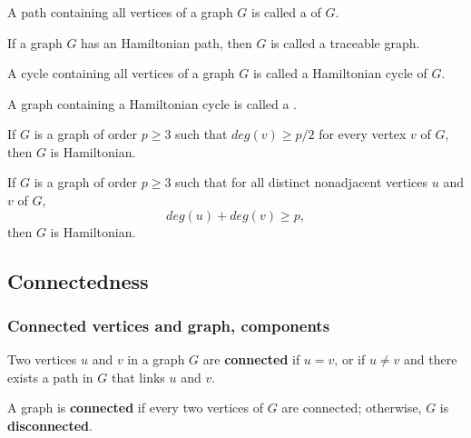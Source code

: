 \documentclass[aspectratio=169]{beamer}
\begin{document}
\begin{frame}\frametitle{}
\begin{definition}
	A path containing all vertices of a graph $G$ is called a  of $G$.
\end{definition}
\begin{definition}
	If a graph $G$ has an Hamiltonian path, then $G$ is called a traceable graph.
\end{definition}
\begin{definition}
	A cycle containing all vertices of a graph $G$ is called a Hamiltonian cycle of $G$.
\end{definition}
\begin{definition}
	A graph containing a Hamiltonian cycle is called a .
\end{definition}
\end{frame}

\begin{frame}
\begin{theorem}
	If $G$ is a graph of order $p\geq 3$ such that $deg(v)\geq p/2$ for every vertex $v$ of $G$, then $G$ is Hamiltonian.
\end{theorem}
\begin{theorem}
	If $G$ is a graph of order $p\geq 3$ such that for all distinct nonadjacent vertices $u$ and $v$ of $G$, $$deg(u)+deg(v)\geq p,$$ 
	then $G$ is Hamiltonian.
\end{theorem}
\end{frame}


\subsection{Connectedness}

\begin{frame}\frametitle{Connected vertices and graph, components}
\begin{definition}
Two vertices $u$ and $v$ in a graph $G$ are \textbf{connected} if $u=v$, or if $u\not =v$ and there exists a path in $G$ that links $u$ and $v$.
\end{definition}
\begin{definition}
A graph is \textbf{connected} if every two vertices of $G$ are connected; otherwise, $G$ is \textbf{disconnected}.
\end{definition}
\end{frame}
\end{document}
